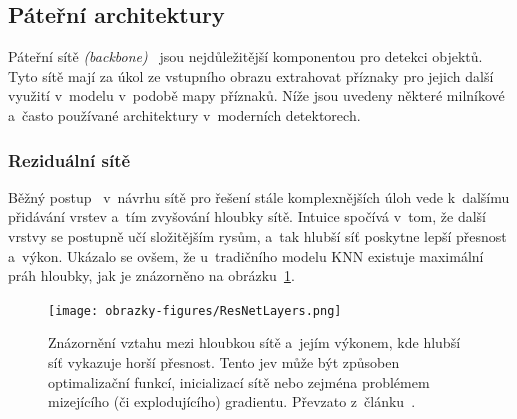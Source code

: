 \subsection{Páteřní architektury}
Páteřní sítě \emph{(backbone)}~\cite{article:SurveyOfObjectDetection} jsou nejdůležitější komponentou pro detekci objektů. Tyto sítě mají za úkol ze vstupního obrazu extrahovat příznaky pro jejich další využití v~modelu v~podobě mapy příznaků. Níže jsou uvedeny některé milníkové a~často používané architektury v~moderních detektorech.

\subsubsection{Reziduální sítě}
Běžný postup~\cite{website:IntroToResNet, website:ResNetIntro} v~návrhu sítě pro řešení stále komplexnějších úloh vede k~dalšímu přidávání vrstev a~tím zvyšování hloubky sítě. Intuice spočívá v~tom, že další vrstvy se postupně učí složitějším rysům, a~tak hlubší síť poskytne lepší přesnost a~výkon. Ukázalo se ovšem, že u~tradičního modelu KNN existuje maximální práh hloubky, jak je znázorněno na obrázku~\ref{img:ResNetLayers}.

\begin{figure}[hbt]
	\centering
	\setlength{\fboxsep}{0pt}
	\texttt{[image: obrazky-figures/ResNetLayers.png]}
	\caption{Znázornění vztahu mezi hloubkou sítě a~jejím výkonem, kde hlubší síť vykazuje horší přesnost. Tento jev může být způsoben optimalizační funkcí, inicializací sítě nebo zejména problémem mizejícího (či explodujícího) gradientu. Převzato z~článku~\cite{article:DeepResNetForImg}.}
	\label{img:ResNetLayers}
\end{figure}

